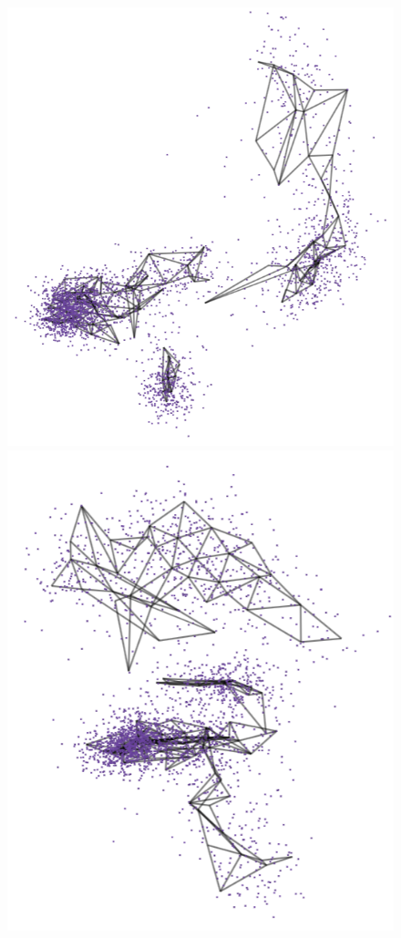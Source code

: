 \documentclass[
  12pt]{article}
\begin{document}
\begin{figure}[H]
%
\begin{minipage}{0.25\linewidth}
\includegraphics{figures/pbmc3k/sc_2.png}\end{minipage}%
%
\begin{minipage}{0.25\linewidth}
\includegraphics{figures/pbmc3k/sc_3.png}\end{minipage}%


\end{figure}
\end{document}
